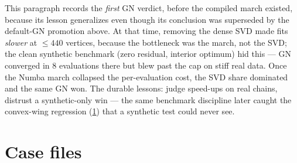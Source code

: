 \documentclass[11pt]{article}
\begin{document}
\begin{caution}[title={Caution (historical, pre-Numba): where GN lost}]
This paragraph records the \emph{first} GN verdict, before the compiled
march existed, because its lesson generalizes even though its conclusion was
superseded by the default-GN promotion above. At that time, removing the
dense SVD made fits \emph{slower} at $\le440$ vertices, because the
bottleneck was the march, not the SVD; the clean synthetic benchmark (zero
residual, interior optimum) hid this --- GN converged in 8 evaluations there
but blew past the cap on stiff real data. Once the Numba march collapsed the
per-evaluation cost, the SVD share dominated and the same GN won. The durable
lessons: judge speed-ups on real chains, distrust a synthetic-only win ---
the same benchmark discipline later caught the convex-wing regression
(\cref{sec:cases}) that a synthetic test could never see.
\end{caution}

\section{Case files}
\label{sec:cases}
\end{document}
